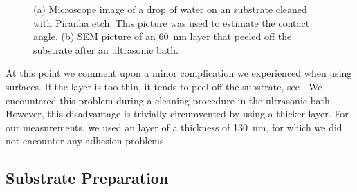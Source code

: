 	\begin{figure}[!bht]
		\begin{subfigure}[t]{ 0.49\linewidth}
			\centering
			\caption{}\label{subfig::wetting}
		\end{subfigure}
		\hfill
		\begin{subfigure}[t]{ 0.49\linewidth}
			\centering
			\caption{}\label{subfig::peeled_ir}
		\end{subfigure}
		\caption[Details for \ir substrates]{(a) Microscope image of a drop of water on an \ir substrate cleaned with Piranha etch. This picture was used to estimate the contact angle. (b) SEM picture of an \SI{60}{nm} \ir layer that peeled off the substrate after an ultrasonic bath.}
		\label{fig::sem_substrates}
	\end{figure}

	At this point we comment upon a minor complication we experienced when using \ir surfaces.
	If the \ir layer is too thin, it tends to peel off the substrate, see .
	We encountered this problem during a cleaning procedure in the ultrasonic bath.
	However, this disadvantage is trivially circumvented by using a thicker \ir layer.
	For our measurements, we used an \ir layer of a thickness of \SI{130}{nm}, for which we did not encounter any adhesion problems.

	\newpage
	\subsection{Substrate Preparation}

